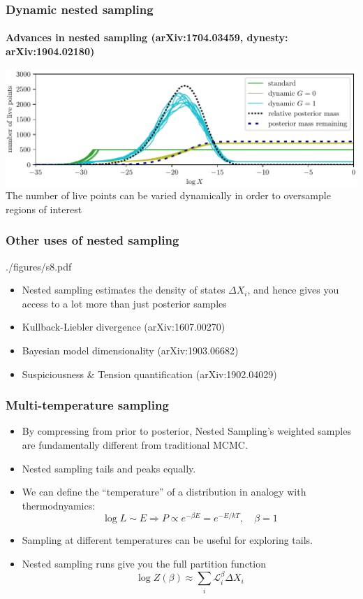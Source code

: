 \documentclass[%
]{beamer}
\newcommand{\lik}{\mathcal{L}}
\begin{document}
\begin{frame}
  \frametitle{Dynamic nested sampling}
  \framesubtitle{Advances in nested sampling (arXiv:1704.03459,  dynesty: arXiv:1904.02180)}
  \includegraphics[width=\textwidth]{figures/dynesty.pdf}
  The number of live points can be varied dynamically in order to oversample regions of interest
\end{frame}

\begin{frame}
    \frametitle{Other uses of nested sampling}
    \begin{figright}[0.4]{./figures/s8.pdf}
        \begin{itemize}
        \item Nested sampling estimates the density of states $\Delta X_i$, and hence gives you access to a lot more than just posterior samples
        \item Kullback-Liebler divergence (arXiv:1607.00270)
        \item Bayesian model dimensionality (arXiv:1903.06682)
        \item Suspiciousness \& Tension quantification (arXiv:1902.04029)
        \end{itemize}
    \end{figright}
\end{frame}

\begin{frame}
    \frametitle{Multi-temperature sampling}
    \begin{itemize}
        \item By compressing from prior to posterior, Nested Sampling's weighted samples are fundamentally different from traditional MCMC.
        \item Nested sampling tails and peaks equally.
        \item We can define the ``temperature'' of a distribution in analogy with thermodnyamics:
            \begin{equation}
                \log L \sim E \Rightarrow P \propto e^{-\beta E} = e^{-E/kT},\quad \beta = 1\nonumber
            \end{equation}
        \item Sampling at different temperatures can be useful for exploring tails.
        \item Nested sampling runs give you the full partition function 
            \begin{equation}
                \log Z(\beta) \approx \sum_i \lik_i^{\beta} \Delta X_{i} \nonumber
            \end{equation}
    \end{itemize}
\end{frame}
\end{document}
